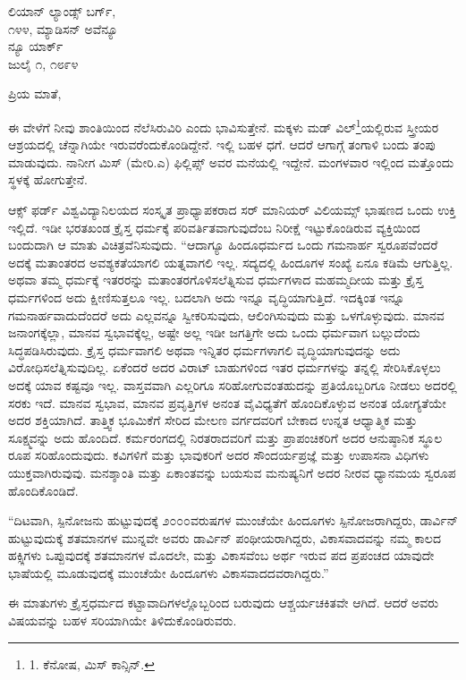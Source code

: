 \begin{flushright}
 ಲಿಯಾನ್ ಲ್ಯಾಂಡ್ಸ್ ಬರ್ಗ್,\\೧೪೪, ಮ್ಯಾಡಿಸನ್ ಅವೆನ್ಯೂ\\ನ್ಯೂ ಯಾರ್ಕ್\\ಜುಲೈ ೧, ೧೮೯೪
\end{flushright}

ಪ್ರಿಯ ಮಾತೆ,

ಈ ವೇಳೆಗೆ ನೀವು ಶಾಂತಿಯಿಂದ ನೆಲೆಸಿರುವಿರಿ ಎಂದು ಭಾವಿಸುತ್ತೇನೆ. ಮಕ್ಕಳು ಮಡ್ ವಿಲ್\footnote{1. ಕೆನೋಷ, ಮಿಸ್ ಕಾನ್ಸಿನ್.}ಯಲ್ಲಿರುವ ಸ್ತ್ರೀಯರ ಆಶ್ರಯದಲ್ಲಿ ಚೆನ್ನಾಗಿಯೇ ಇರುವರೆಂದುಕೊಂಡಿದ್ದೇನೆ. ಇಲ್ಲಿ ಬಹಳ ಧಗೆ. ಆದರೆ ಆಗಾಗ್ಗೆ ತಂಗಾಳಿ ಬಂದು ತಂಪು ಮಾಡುವುದು. ನಾನೀಗ ಮಿಸ್ (ಮೇರಿ.ಎ) ಫಿಲ್ಲಿಪ್ಸ್ ಅವರ ಮನೆಯಲ್ಲಿ ಇದ್ದೇನೆ. ಮಂಗಳವಾರ ಇಲ್ಲಿಂದ ಮತ್ತೊಂದು ಸ್ಥಳಕ್ಕೆ ಹೋಗುತ್ತೇನೆ.

ಆಕ್ಸ್ ಫರ್ಡ್ ವಿಶ್ವವಿದ್ಯಾನಿಲಯದ ಸಂಸ್ಕೃತ ಪ್ರಾಧ್ಯಾಪಕರಾದ ಸರ್ ಮಾನಿಯರ್ ವಿಲಿಯಮ್ಸ್ ಭಾಷಣದ ಒಂದು ಉಕ್ತಿ ಇಲ್ಲಿದೆ. ಇಡೀ ಭರತಖಂಡ ಕ್ರೈಸ್ತ ಧರ್ಮಕ್ಕೆ ಪರಿವರ್ತಿತವಾಗುವುದೆಂಬ ನಿರೀಕ್ಷೆ ಇಟ್ಟುಕೊಂಡಿರುವ ವ್ಯಕ್ತಿಯಿಂದ ಬಂದುದಾಗಿ ಆ ಮಾತು ವಿಚಿತ್ರವೆನಿಸುವುದು. “ಆದಾಗ್ಯೂ ಹಿಂದೂಧರ್ಮದ ಒಂದು ಗಮನಾರ್ಹ ಸ್ವರೂಪವೆಂದರೆ ಅದಕ್ಕೆ ಮತಾಂತರದ ಅವಶ್ಯಕತೆಯಾಗಲಿ ಯತ್ನವಾಗಲಿ ಇಲ್ಲ. ಸದ್ಯದಲ್ಲಿ ಹಿಂದೂಗಳ ಸಂಖ್ಯೆ ಏನೂ ಕಡಿಮೆ ಆಗುತ್ತಿಲ್ಲ. ಅಥವಾ ತಮ್ಮ ಧರ್ಮಕ್ಕೆ ಇತರರನ್ನು ಮತಾಂತರಗೊಳಿಸಲೆತ್ನಿಸುವ ಧರ್ಮಗಳಾದ ಮಹಮ್ಮದೀಯ ಮತ್ತು ಕ್ರೈಸ್ತ ಧರ್ಮಗಳಿಂದ ಅದು ಕ್ಷೀಣಿಸುತ್ತಲೂ ಇಲ್ಲ. ಬದಲಾಗಿ ಅದು ಇನ್ನೂ ವೃದ್ಧಿಯಾಗುತ್ತಿದೆ. ಇದಕ್ಕಿಂತ ಇನ್ನೂ ಗಮನಾರ್ಹವಾದುದೆಂದರೆ ಅದು ಎಲ್ಲವನ್ನೂ ಸ್ವೀಕರಿಸುವುದು, ಆಲಿಂಗಿಸುವುದು ಮತ್ತು ಒಳಗೊಳ್ಳುವುದು. ಮಾನವ ಜನಾಂಗಕ್ಕೆಲ್ಲಾ, ಮಾನವ ಸ್ವಭಾವಕ್ಕೆಲ್ಲ, ಅಷ್ಟೇ ಅಲ್ಲ ಇಡೀ ಜಗತ್ತಿಗೇ ಅದು ಒಂದು ಧರ್ಮವಾಗ ಬಲ್ಲುದೆಂದು ಸಿದ್ಧಪಡಿಸಿರುವುದು. ಕ್ರೈಸ್ತ ಧರ್ಮವಾಗಲಿ ಅಥವಾ ಇನ್ನಿತರ ಧರ್ಮಗಳಾಗಲಿ ವೃದ್ಧಿಯಾಗುವುದನ್ನು ಅದು ವಿರೋಧಿಸಲೆತ್ನಿಸುವುದಿಲ್ಲ. ಏಕೆಂದರೆ ಅದರ ವಿರಾಟ್ ಬಾಹುಗಳಿಂದ ಇತರ ಧರ್ಮಗಳನ್ನು ತನ್ನಲ್ಲಿ ಸೇರಿಸಿಕೊಳ್ಳಲು ಅದಕ್ಕೆ ಯಾವ ಕಷ್ಟವೂ ಇಲ್ಲ. ವಾಸ್ತವವಾಗಿ ಎಲ್ಲರಿಗೂ ಸರಿಹೋಗುವಂತಹುದನ್ನು ಪ್ರತಿಯೊಬ್ಬರಿಗೂ ನೀಡಲು ಅದರಲ್ಲಿ ಸರಕು ಇದೆ. ಮಾನವ ಸ್ವಭಾವ, ಮಾನವ ಪ್ರವೃತ್ತಿಗಳ ಅನಂತ ವೈವಿಧ್ಯತೆಗೆ ಹೊಂದಿಕೊಳ್ಳುವ ಅನಂತ ಯೋಗ್ಯತೆಯೇ ಅದರ ಶಕ್ತಿಯಾಗಿದೆ. ತಾತ್ತ್ವಿಕ ಭೂಮಿಕೆಗೆ ಸೇರಿದ ಮೇಲಣ ವರ್ಗದವರಿಗೆ ಬೇಕಾದ ಉನ್ನತ ಆಧ್ಯಾತ್ಮಿಕ ಮತ್ತು ಸೂಕ್ಷ್ಮವನ್ನು ಅದು ಹೊಂದಿದೆ. ಕರ್ಮರಂಗದಲ್ಲಿ ನಿರತರಾದವರಿಗೆ ಮತ್ತು ಪ್ರಾಪಂಚಿಕರಿಗೆ ಅದರ ಆನುಷ್ಠಾನಿಕ ಸ್ಥೂಲ ರೂಪ ಸರಿಹೊಂದುವುದು. ಕವಿಗಳಿಗೆ ಮತ್ತು ಭಾವುಕರಿಗೆ ಅದರ ಸೌಂದರ್ಯಪ್ರಜ್ಞೆ ಮತ್ತು ಉಪಾಸನಾ ವಿಧಿಗಳು ಯುಕ್ತವಾಗಿರುವುವು. ಮನಶ್ಶಾಂತಿ ಮತ್ತು ಏಕಾಂತವನ್ನು ಬಯಸುವ ಮನುಷ್ಯನಿಗೆ ಅದರ ನೀರವ ಧ್ಯಾನಮಯ ಸ್ವರೂಪ ಹೊಂದಿಕೊಂಡಿದೆ.

“ದಿಟವಾಗಿ, ಸ್ಪಿನೋಜನು ಹುಟ್ಟುವುದಕ್ಕೆ ೨೦೦೦ವರುಷಗಳ ಮುಂಚೆಯೇ ಹಿಂದೂಗಳು ಸ್ಪಿನೋಜರಾಗಿದ್ದರು, ಡಾರ್ವಿನ್ ಹುಟ್ಟುವುದುಕ್ಕೆ ಶತಮಾನಗಳ ಮುನ್ನವೇ ಅವರು ಡಾರ್ವಿನ್ ಪಂಥೀಯರಾಗಿದ್ದರು, ವಿಕಾಸವಾದವನ್ನು ನಮ್ಮ ಕಾಲದ ಹಕ್ಸ್ಲಿಗಳು ಒಪ್ಪುವುದಕ್ಕೆ ಶತಮಾನಗಳ ಮೊದಲೇ, ಮತ್ತು ವಿಕಾಸವೆಂಬ ಅರ್ಥ ಇರುವ ಪದ ಪ್ರಪಂಚದ ಯಾವುದೇ ಭಾಷೆಯಲ್ಲಿ ಮೂಡುವುದಕ್ಕೆ ಮುಂಚೆಯೇ ಹಿಂದೂಗಳು ವಿಕಾಸವಾದದವರಾಗಿದ್ದರು.”

ಈ ಮಾತುಗಳು ಕ್ರೈಸ್ತಧರ್ಮದ ಕಟ್ಟಾವಾದಿಗಳಲ್ಲೊಬ್ಬರಿಂದ ಬರುವುದು ಆಶ್ಚರ್ಯಚಕಿತವೇ ಆಗಿದೆ. ಆದರೆ ಅವರು ವಿಷಯವನ್ನು ಬಹಳ ಸರಿಯಾಗಿಯೇ ತಿಳಿದುಕೊಂಡಿರುವರು.

